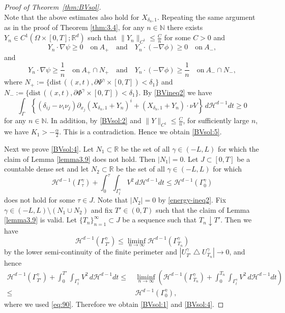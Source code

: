 \documentclass{amsart}
\theoremstyle{definition}
\def\R{{\mathbb{R}}}
\newcommand{\dist}{\mathrm{dist}\,}
\begin{document}
\begin{proof}[Proof of Theorem~\ref{thm:BVsol}]
\begin{equation*}
\end{equation*}
Note that the above estimates also hold for $X_{\delta_n,1}$.
Repeating the same argument as in the proof of Theorem \ref{thm:3.4}, for any $n\in \mathbb{N}$ there exists 
$Y_n \in C^1 (\Omega \times [0,T] ; \R^d)$ such that $\|Y_n \|_{C^1} \leq \frac{C}{n}$ for some $C>0$
and
\[
Y_n \cdot \nabla \psi \geq 0 \quad \text{on} \ A_+ 
\quad
\text{and}
\quad
Y_n \cdot (-\nabla \phi) \geq 0 \quad \text{on} \ A_-,
\]
and
\[
Y_n \cdot \nabla \psi \geq \frac{1}{n} \quad \text{on} \ A_+ \cap N_
+
\quad
\text{and}
\quad
Y_n \cdot (-\nabla \phi) \geq \frac{1}{n} \quad \text{on} \ A_- \cap N_-,
\]
where $N_+:= \{ \dist ((x,t), \partial \Psi^\gamma \times [0,T])<\delta_1 \} $ and 
$N_-:= \{ \dist ((x,t), \partial \Phi^\gamma \times [0,T])<\delta_1 \} $.
By \eqref{BVineq2} we have
\[
\int_{\Gamma }
\left\{
\left( \delta_{ij} - \nu_i \nu_j \right)
\partial_{x_j} (X_{\delta_n,1} +Y_n)^i +
(X_{\delta_n,1} +Y_n) \cdot \nu V 
\right\} \, d \mathcal{H}^{d-1} dt
\geq 0
\]
for any $n \in \mathbb{N}$.
In addition, by \eqref{BVsol:2} and $\|Y \|_{C^1} \leq \frac{C}{n}$, for sufficiently large $n$, we have $K_1 >-\frac{\alpha}{2}$. This is a contradiction. Hence we obtain \eqref{BVsol:5}.

Next we prove \eqref{BVsol:4}. 
Let $N_1 \subset \R$ be the set of all $\gamma \in (-L,L)$ for which the claim of Lemma \ref{lemma3.9} does not hold. Then $|N_1|=0$. Let $J \subset [0,T]$ be a countable dense set and let $N_2 \subset \R$ be the set of all $\gamma \in (-L,L)$ for which 
\begin{equation}\label{eq:90}
\mathcal{H}^{d-1} (\Gamma_{\tau} ^\gamma) 
+
\int_{0} ^{\tau} 
\int_{\Gamma_t ^\gamma} V^2 \, d\mathcal{H}^{d-1} dt
\leq 
\mathcal{H}^{d-1} (\Gamma_{0} ^\gamma)
\end{equation}
does not hold for some $\tau \in J$. Note that 
 $|N_2|=0$ by \eqref{energy-ineq2}.
Fix $\gamma \in (-L,L) \setminus (N_1 \cup N_2)$ and fix $T' \in (0,T)$ such that the claim of Lemma \ref{lemma3.9} is valid. Let $\{ T_n \}_{n=1} ^\infty \subset J$ be a sequence such that $T_n \downarrow T'$. Then we have
\[
\mathcal{H}^{d-1} (\Gamma_{T'} ^\gamma)
\leq 
\liminf_{n\to \infty}
\mathcal{H}^{d-1} (\Gamma_{T_n} ^\gamma)
\]
by the lower semi-continuity of the finite perimeter and 
$|U_{T'} ^\gamma \bigtriangleup U_{T_n} ^\gamma| \to 0$, and hence
\begin{equation*}
\begin{split}
\mathcal{H}^{d-1} (\Gamma_{T'} ^\gamma) 
+
\int_{0} ^{T'} 
\int_{\Gamma_t ^\gamma} V^2 \, d\mathcal{H}^{d-1} dt
\leq & \,
\liminf_{n\to \infty}
\left(
\mathcal{H}^{d-1} (\Gamma_{T_n} ^\gamma) 
+
\int_{0} ^{T_n} 
\int_{\Gamma_t ^\gamma} V^2 \, d\mathcal{H}^{d-1} dt
\right)\\
\leq & \,
\mathcal{H}^{d-1} (\Gamma_{0} ^\gamma),    
\end{split}    
\end{equation*}
where we used \eqref{eq:90}. Therefore we obtain \eqref{BVsol:1} and \eqref{BVsol:4}. 
\end{proof}
\end{document}
